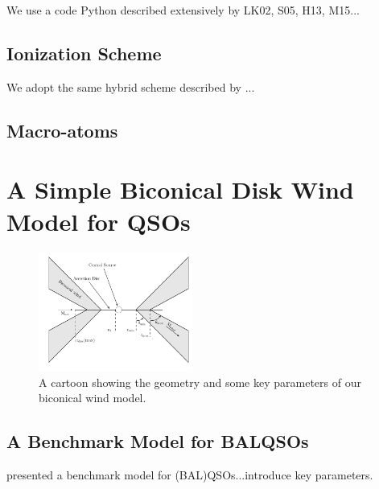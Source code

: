 \documentclass[useAMS,usenatbib]{mn2e_x}
\begin{document}
We use a code Python described extensively by LK02, S05, H13, M15...

\subsection{Ionization Scheme}

We adopt the same hybrid scheme described by \cite{M15}...

\subsection{Macro-atoms}


\section{A Simple Biconical Disk Wind Model for QSOs}

\begin{figure}
\centering
\includegraphics[width=0.45\textwidth]{figures/fig2_cartoon.png}
\caption
{
A cartoon showing the geometry and some key parameters of
our biconical wind model.
}
\label{fig:alpha_ox}
\end{figure}

\subsection{A Benchmark Model for BALQSOs}

\cite{higginbottom2013} presented a benchmark model for
(BAL)QSOs...introduce key parameters. 
\end{document}
